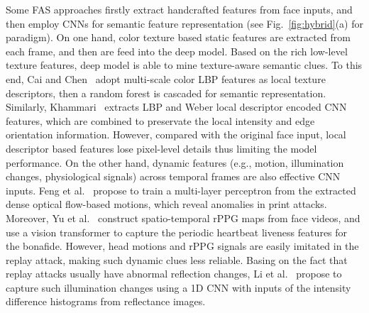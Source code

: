 \documentclass[10pt,journal,compsoc]{IEEEtran}
\begin{document}
Some FAS approaches firstly extract handcrafted features from face inputs, and then employ CNNs for semantic feature representation (see Fig.~\ref{fig:hybrid}(a) for paradigm). On one hand, color texture based static features are extracted from each frame, and then are feed into the deep model. Based on the rich low-level texture features, deep model is able to mine texture-aware semantic clues. To this end, Cai and Chen~\cite{cai2019learning} adopt multi-scale color LBP features as local texture descriptors, then a random forest is cascaded for semantic representation. Similarly, Khammari~\cite{khammari2019robust} extracts LBP and Weber local descriptor encoded CNN features, which are combined to preservate the local intensity and edge orientation information. However, compared with the original face input, local descriptor based features lose pixel-level details thus limiting the model performance. On the other hand, dynamic features (e.g., motion, illumination changes, physiological signals) across temporal frames are also effective CNN inputs. Feng et al.~\cite{feng2016integration} propose to train a multi-layer perceptron from the extracted dense optical flow-based motions, which reveal anomalies in print attacks. Moreover, Yu et al.~\cite{yu2021transrppg} construct spatio-temporal rPPG maps from face videos, and use a vision transformer to capture the periodic heartbeat liveness features for the bonafide. However, head motions and rPPG signals are easily imitated in the replay attack, making such dynamic clues less reliable. Basing on the fact that replay attacks usually have abnormal reflection changes, Li et al.~\cite{li20203d} propose to capture such illumination changes using a 1D CNN with inputs of the intensity difference histograms from reflectance images.   
\end{document}
